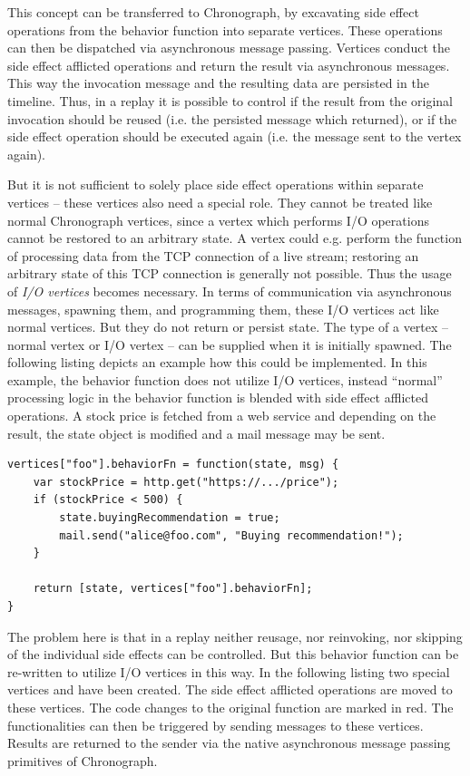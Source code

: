 This concept can be transferred to Chronograph, by excavating side effect
operations from the behavior function into separate vertices. These operations
can then be dispatched via asynchronous message passing.
Vertices conduct the side effect afflicted operations and return the result
via asynchronous messages. This way the invocation message and the resulting 
data are persisted in the timeline. Thus, in a replay it is possible to control 
if the result from the original invocation should be reused (i.e. the persisted 
message which returned), or if the side effect operation should be executed 
again (i.e. the message sent to the vertex again).

But it is not sufficient to solely place side effect operations within separate 
vertices -- these vertices also need a special role. They cannot be treated like 
normal Chronograph vertices, since a vertex which performs I/O operations cannot 
be restored to an arbitrary state.
A vertex could e.g. perform the function of processing data from the TCP 
connection of a live stream; restoring an arbitrary state of this TCP connection 
is generally not possible. Thus the usage of \emph{I/O vertices} becomes 
necessary. In terms of communication via asynchronous messages, spawning them, 
and programming them, these I/O vertices act like normal vertices. But they do 
not return or persist state.
The type of a vertex -- normal vertex or I/O vertex -- can be supplied when it 
is initially spawned. The following listing depicts an example how this could be 
implemented. In this example, the behavior function does not utilize I/O vertices,
instead ``normal'' processing logic in the behavior function is blended with side 
effect afflicted operations. A stock price is fetched from a web service and 
depending on the result, the state object is modified and a mail message may be 
sent.

\pagebreak

\begin{lstlisting}[style=styled]
vertices["foo"].behaviorFn = function(state, msg) {
	var stockPrice = http.get("https://.../price");
	if (stockPrice < 500) {
		state.buyingRecommendation = true;
		mail.send("alice@foo.com", "Buying recommendation!");
	}

	return [state, vertices["foo"].behaviorFn];
}
\end{lstlisting}

The problem here is that in a replay neither reusage, nor reinvoking, nor
skipping of the individual side effects can be controlled.
But this behavior function can be re-written to utilize I/O vertices in this
way. In the following listing two special vertices  and
 have been created. The side effect afflicted operations are 
moved to these vertices. The code changes to the original function are marked 
in red. The functionalities can then be triggered by sending messages to these 
vertices. Results are returned to the sender via the native asynchronous 
message passing primitives of Chronograph.

